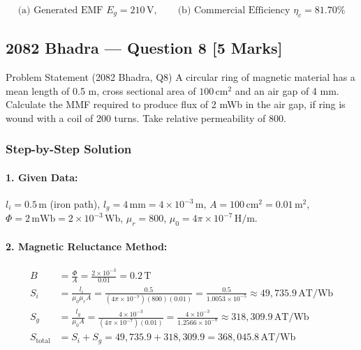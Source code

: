 \documentclass[11pt,a4paper,oneside]{article}
\begin{document}
\begin{answerbox}
\[
\text{(a) Generated EMF } E_g = 210\,\mathrm{V}, \qquad \text{(b) Commercial Efficiency } \eta_c = 81.70\%
\]
\end{answerbox}

\newpage

\subsection{2082 Bhadra --- Question 8 [5 Marks]}

\begin{questionbox}{Problem Statement (2082 Bhadra, Q8)}
A circular ring of magnetic material has a mean length of 0.5 m, cross sectional area of $100\,\mathrm{cm}^2$ and an air gap of 4 mm. Calculate the MMF required to produce flux of 2 mWb in the air gap, if ring is wound with a coil of 200 turns. Take relative permeability of 800.
\end{questionbox}

\subsubsection*{Step-by-Step Solution}
\paragraph{1. Given Data:}
$l_i = 0.5\,\mathrm{m}$ (iron path), \quad $l_g = 4\,\mathrm{mm} = 4 \times 10^{-3}\,\mathrm{m}$, \quad $A = 100\,\mathrm{cm}^2 = 0.01\,\mathrm{m}^2$, \quad $\Phi = 2\,\mathrm{mWb} = 2 \times 10^{-3}\,\mathrm{Wb}$, \quad $\mu_r = 800$, \quad $\mu_0 = 4\pi \times 10^{-7}\,\mathrm{H/m}$.

\paragraph{2. Magnetic Reluctance Method:}
\begin{align*}
  B &= \frac{\Phi}{A} = \frac{2 \times 10^{-3}}{0.01} = 0.2\,\mathrm{T} \\
  S_i &= \frac{l_i}{\mu_0 \mu_r A} = \frac{0.5}{(4\pi \times 10^{-7})(800)(0.01)} = \frac{0.5}{1.0053 \times 10^{-5}} \approx 49,735.9\,\mathrm{AT/Wb} \\
  S_g &= \frac{l_g}{\mu_0 A} = \frac{4 \times 10^{-3}}{(4\pi \times 10^{-7})(0.01)} = \frac{4 \times 10^{-3}}{1.2566 \times 10^{-8}} \approx 318,309.9\,\mathrm{AT/Wb} \\
  S_{\text{total}} &= S_i + S_g = 49,735.9 + 318,309.9 = 368,045.8\,\mathrm{AT/Wb}
\end{align*}
\end{document}
